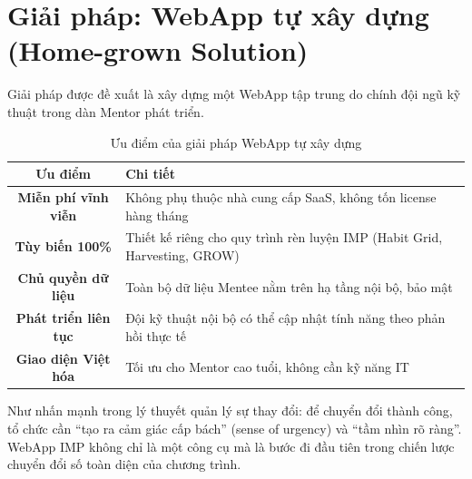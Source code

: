 \section{Giải pháp: WebApp tự xây dựng (Home-grown Solution)}

Giải pháp được đề xuất là xây dựng một WebApp tập trung do chính đội ngũ kỹ thuật trong dàn Mentor phát triển.

\begin{table}[H]
  \centering
  \begin{tabularx}{\textwidth}{|c|L|}
    \hline
     \textbf{\color{white} Ưu điểm} & \textbf{\color{white} Chi tiết} \\ \hline
    \textbf{Miễn phí vĩnh viễn} & Không phụ thuộc nhà cung cấp SaaS, không tốn license hàng tháng \\ \hline
    \textbf{Tùy biến 100\%} & Thiết kế riêng cho quy trình rèn luyện IMP (Habit Grid, Harvesting, GROW) \\ \hline
    \textbf{Chủ quyền dữ liệu} & Toàn bộ dữ liệu Mentee nằm trên hạ tầng nội bộ, bảo mật \\ \hline
    \textbf{Phát triển liên tục} & Đội kỹ thuật nội bộ có thể cập nhật tính năng theo phản hồi thực tế \\ \hline
    \textbf{Giao diện Việt hóa} & Tối ưu cho Mentor cao tuổi, không cần kỹ năng IT \\ \hline
  \end{tabularx}
  \caption{Ưu điểm của giải pháp WebApp tự xây dựng}
\end{table}

Như \citet{kotter2012} nhấn mạnh trong lý thuyết quản lý sự thay đổi: để chuyển đổi thành công, tổ chức cần ``tạo ra cảm giác cấp bách'' (sense of urgency) và ``tầm nhìn rõ ràng''. WebApp IMP không chỉ là một công cụ mà là bước đi đầu tiên trong chiến lược chuyển đổi số toàn diện của chương trình.

